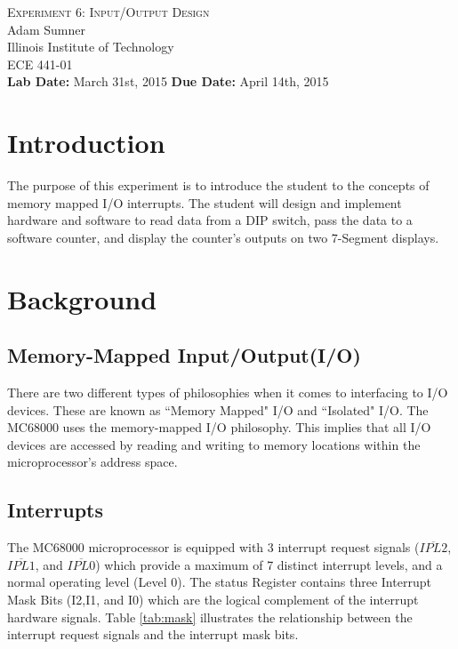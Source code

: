 \documentclass[12pt,Letter]{article}
\begin{document}
\begin{titlepage}
	\begin{center}
		
		
		\vfill
		
		\textsc{\LARGE Experiment 6: Input/Output Design}\\[1.5cm]
		
		\Large Adam Sumner\\[0.5cm]
		
		\Large Illinois Institute of Technology\\[0.5cm]
		
		\Large ECE 441-01\\[0.5cm]	
		\noindent
		\vfill
		\large \textbf{Lab Date:} March 31st, 2015\hfill
		\large \textbf{Due Date:} April 14th, 2015
		
		
	\end{center}
\end{titlepage}

\section{Introduction}
The purpose of this experiment is to introduce the student to the concepts of memory mapped I/O interrupts. The student will design and implement hardware and software to read data from a DIP switch, pass the data to a software counter, and display the counter's outputs on two 7-Segment displays.
\section{Background}
\subsection{Memory-Mapped Input/Output(I/O)}
There are two different types of philosophies when it comes to interfacing to I/O devices. These are known as ``Memory Mapped" I/O and ``Isolated" I/O. The MC68000 uses the memory-mapped I/O philosophy. This implies that all I/O devices are accessed by reading and writing to memory locations within the microprocessor's address space\cite{expman}.
\subsection{Interrupts}
The MC68000 microprocessor is equipped with 3 interrupt request signals ($\overline{IPL2}$, $\overline{IPL1}$, and $\overline{IPL0}$) which provide a maximum of 7 distinct interrupt levels, and a normal operating level (Level 0). The status Register contains three Interrupt Mask Bits (I2,I1, and I0) which are the logical complement of the interrupt hardware signals. Table \ref{tab:mask} illustrates the relationship between the interrupt request signals and the interrupt mask bits\cite{expman}.
\end{document}
